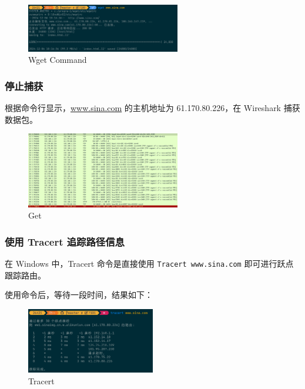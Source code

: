 \documentclass[14pt,a4paper,UTF8,twoside]{article}
\begin{document}
\begin{figure}[H]
  \centering
  \includegraphics[width=0.6\textwidth]{lab3/wget.png}
  \caption{Wget Command}
\end{figure}

\subsubsection{停止捕获}

根据命令行显示，\href{www.sina.com}{www.sina.com} 的主机地址为 61.170.80.226，在 Wireshark 捕获数据包。

\begin{figure}[H]
  \centering
  \includegraphics[width=0.6\textwidth]{lab3/get.png}
  \caption{Get}
\end{figure}

\subsubsection{使用 Tracert 追踪路径信息}

在 Windows 中，Tracert 命令是直接使用 \texttt{Tracert www.sina.com} 即可进行跃点跟踪路由。

使用命令后，等待一段时间，结果如下：

\begin{figure}[H]
  \centering
  \includegraphics[width=0.5\textwidth]{lab3/tracert.png}
  \caption{Tracert}
\end{figure}
\end{document}
